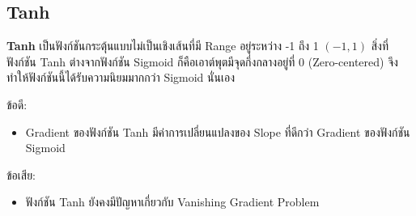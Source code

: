\subsection{Tanh}

\textbf{Tanh} เป็นฟังก์ชันกระตุ้นแบบไม่เป็นเชิงเส้นที่มี Range อยู่ระหว่าง -1 ถึง 1 $(-1, 1)$ สิ่งที่ฟังก์ชัน Tanh ต่างจากฟังก์ชัน Sigmoid ก็คือเอาต์พุตมีจุดกึ่งกลางอยู่ที่ 0 (Zero-centered) จึงทำให้ฟังก์ชันนี้ได้รับความนิยมมากกว่า Sigmoid นั่นเอง

\noindent ข้อดี:
\begin{itemize}[topsep=0pt,noitemsep]\setlength\itemsep{0.5em}
  \item Gradient ของฟังก์ชัน Tanh มีค่าการเปลี่ยนแปลงของ Slope ที่ดีกว่า Gradient ของฟังก์ชัน Sigmoid
\end{itemize}
%
ข้อเสีย:
\begin{itemize}[topsep=0pt,noitemsep]\setlength\itemsep{0.5em}
  \item ฟังก์ชัน Tanh ยังคงมีปัญหาเกี่ยวกับ Vanishing Gradient Problem
\end{itemize}
%
